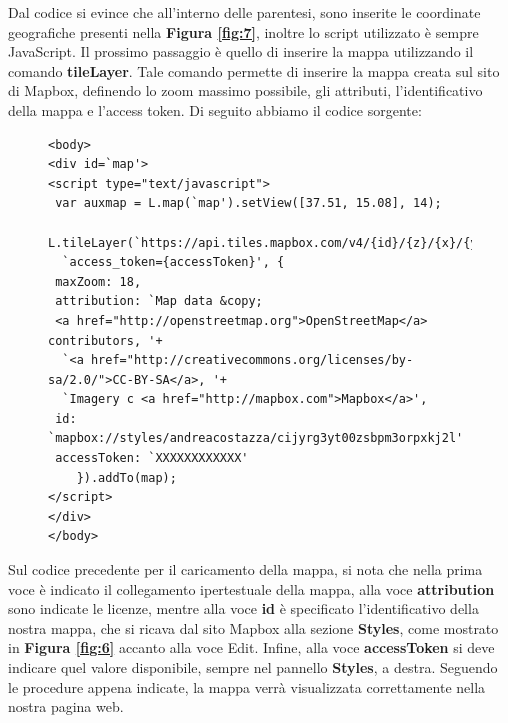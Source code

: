 \documentclass[a4paper,11pt]{article}
\begin{document}
Dal codice si evince che all'interno delle parentesi, sono inserite le coordinate geografiche presenti nella \textbf{Figura \ref{fig:7}}, inoltre lo script utilizzato è sempre JavaScript.
Il prossimo passaggio è quello di inserire la mappa utilizzando il comando \textbf{tileLayer}. Tale comando permette di inserire la mappa creata sul sito di Mapbox, definendo lo zoom massimo possibile, gli attributi, l'identificativo della mappa e l'access token. Di seguito abbiamo il codice sorgente:
\begin{figure}[htb]
\begin{lstlisting}[style=htmlcssjs]
<body>		
<div id=`map'>
<script type="text/javascript">
 var auxmap = L.map(`map').setView([37.51, 15.08], 14);
 L.tileLayer(`https://api.tiles.mapbox.com/v4/{id}/{z}/{x}/{y}.png?'+ 
  `access_token={accessToken}', {
 maxZoom: 18,
 attribution: `Map data &copy; 
 <a href="http://openstreetmap.org">OpenStreetMap</a> contributors, '+
  `<a href="http://creativecommons.org/licenses/by-sa/2.0/">CC-BY-SA</a>, '+
  `Imagery c <a href="http://mapbox.com">Mapbox</a>',
 id: `mapbox://styles/andreacostazza/cijyrg3yt00zsbpm3orpxkj2l'
 accessToken: `XXXXXXXXXXXX'
	}).addTo(map);
</script>
</div>
</body>
\end{lstlisting}
\end{figure}
\newpage
Sul codice precedente per il caricamento della mappa, si nota che nella prima voce è indicato il collegamento ipertestuale della mappa, alla voce \textbf{attribution} sono indicate le licenze, mentre alla voce \textbf{id} è specificato l'identificativo della nostra mappa, che si ricava dal sito Mapbox alla sezione \textbf{Styles}, come mostrato in \textbf{Figura \ref{fig:6}} accanto alla voce Edit.
Infine, alla voce \textbf{accessToken} si deve indicare quel valore disponibile, sempre nel pannello \textbf{Styles}, a destra. \newline
Seguendo le procedure appena indicate, la mappa verrà visualizzata correttamente nella nostra pagina web.
\end{document}
